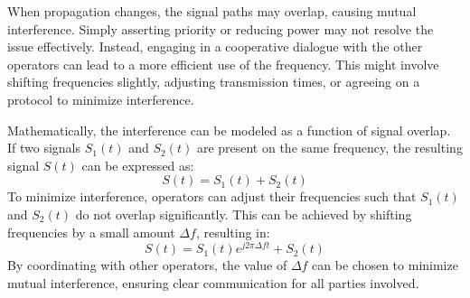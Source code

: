 When propagation changes, the signal paths may overlap, causing mutual interference. Simply asserting priority or reducing power may not resolve the issue effectively. Instead, engaging in a cooperative dialogue with the other operators can lead to a more efficient use of the frequency. This might involve shifting frequencies slightly, adjusting transmission times, or agreeing on a protocol to minimize interference.

Mathematically, the interference can be modeled as a function of signal overlap. If two signals \( S_1(t) \) and \( S_2(t) \) are present on the same frequency, the resulting signal \( S(t) \) can be expressed as:
\[ S(t) = S_1(t) + S_2(t) \]
To minimize interference, operators can adjust their frequencies such that \( S_1(t) \) and \( S_2(t) \) do not overlap significantly. This can be achieved by shifting frequencies by a small amount \( \Delta f \), resulting in:
\[ S(t) = S_1(t) e^{j2\pi \Delta f t} + S_2(t) \]
By coordinating with other operators, the value of \( \Delta f \) can be chosen to minimize mutual interference, ensuring clear communication for all parties involved.

